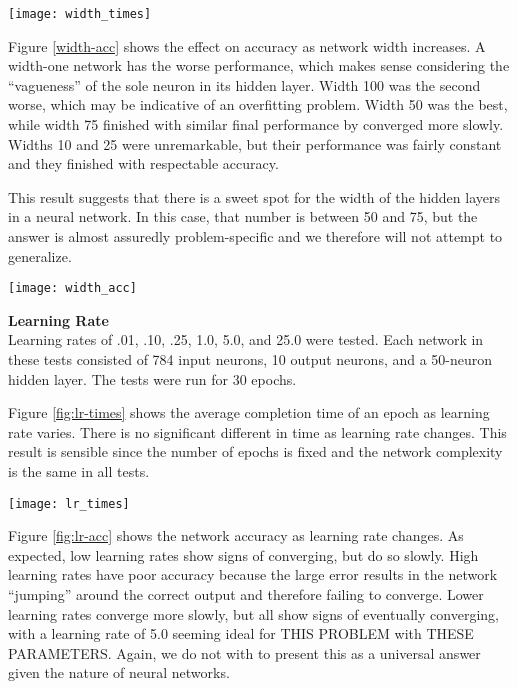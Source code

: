 \documentclass[letter,11pt,titlepage]{article}
\begin{document}
\begin{center}
    \centering
    \texttt{[image: width\_times]}
    \label{fig:width-times}
\end{center}

Figure \ref{width-acc} shows the effect on accuracy as network width increases. A width-one network has the worse performance, which makes sense considering the ``vagueness'' of the sole neuron in its hidden layer. Width 100 was the second worse, which may be indicative of an overfitting problem. Width 50 was the best, while width 75 finished with similar final performance by converged more slowly. Widths 10 and 25 were unremarkable, but their performance was fairly constant and they finished with respectable accuracy.

This result suggests that there is a sweet spot for the width of the hidden layers in a neural network. In this case, that number is between 50 and 75, but the answer is almost assuredly problem-specific and we therefore will not attempt to generalize.

\begin{center}
    \centering
    \texttt{[image: width\_acc]}
    \label{fig:width-acc}
\end{center}

\textbf{\large{Learning Rate}} \\
Learning rates of .01, .10, .25, 1.0, 5.0, and 25.0 were tested. Each network in these tests consisted of 784 input neurons, 10 output neurons, and a 50-neuron hidden layer. The tests were run for 30 epochs.

Figure \ref{fig:lr-times} shows the average completion time of an epoch as learning rate varies. There is no significant different in time as learning rate changes. This result is sensible since the number of epochs is fixed and the network complexity is the same in all tests.

\begin{center}
    \centering
    \texttt{[image: lr\_times]}
    \label{fig:lr-times}
\end{center}

Figure \ref{fig:lr-acc} shows the network accuracy as learning rate changes. As expected, low learning rates show signs of converging, but do so slowly. High learning rates have poor accuracy because the large error results in the network ``jumping'' around the correct output and therefore failing to converge. Lower learning rates converge more slowly, but all show signs of eventually converging, with a learning rate of 5.0 seeming ideal for THIS PROBLEM with THESE PARAMETERS. Again, we do not with to present this as a universal answer given the nature of neural networks.
\end{document}
